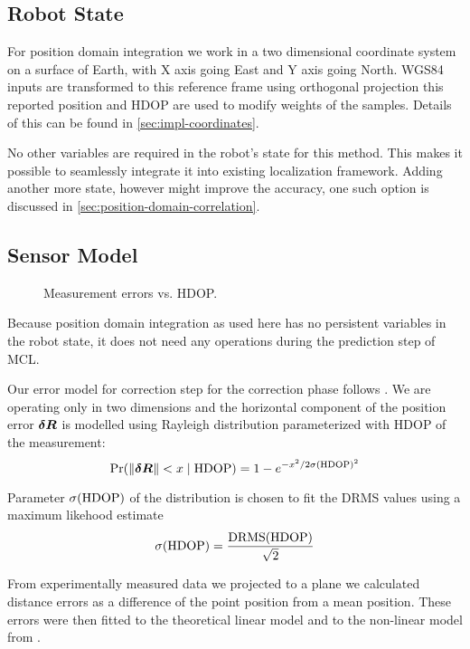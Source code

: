 \subsection{Robot State}
For position domain integration we work in a two dimensional coordinate
system on a surface of Earth, with X axis going East and Y axis going North.
WGS84 inputs are transformed to this reference frame using orthogonal projection
this reported position and HDOP are used to modify weights of the samples.
Details of this can be found in \cref{sec:impl-coordinates}.

No other variables are required in the robot's state for this method.
This makes it possible to seamlessly integrate it into existing localization framework.
Adding another more state, however might improve the accuracy, one such option
is discussed in \cref{sec:position-domain-correlation}.

\subsection{Sensor Model}
\label{sec:wgs84-hdop-error}

\begin{figure}[htp]
	\centering
	\noindent{}
	\caption{Measurement errors vs. HDOP.}
	\label{fig:wgs84-hdop-error}
\end{figure}

Because position domain integration as used here has no persistent variables in the
robot state, it does not need any operations during the prediction step of MCL.

Our error model for correction step for the correction phase follows \cite{www-wilson}.
We are operating only in two dimensions and
the horizontal component of the position error  \(\bm{\delta R}\) is modelled using Rayleigh distribution
parameterized with HDOP of the measurement:
\begin{equation}
	\operatorname{\mathrm{Pr}}(\lVert\bm{\delta R}\rVert < x \mid \mathrm{HDOP}) =
		1 - e^{-x^2/2\sigma(\mathrm{HDOP})^2}
\end{equation}

Parameter \(\sigma(\mathrm{HDOP})\) of the distribution is chosen to fit the DRMS values using a maximum likehood estimate
\begin{equation}
	\sigma(\mathrm{HDOP}) = \frac{\mathrm{DRMS}(\mathrm{HDOP})}{\sqrt{2}}
\end{equation}

From experimentally measured data we projected to a plane we calculated
distance errors as a difference of the point position from a mean position.
These errors were then fitted to the theoretical linear model and to
the non-linear model from \cite{www-wilson}.

